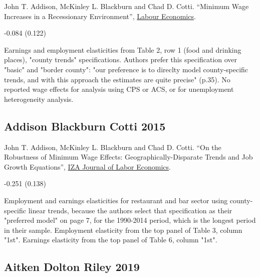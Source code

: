 \noindent John T. Addison, McKinley L. Blackburn and Chad D. Cotti. ``Minimum Wage Increases in a Recessionary Environment'', \href{https://doi.org/10.1016/j.labeco.2013.02.004}{Labour Economics}.

\vspace{0.7em}

 -0.084 (0.122)

\vspace{0.7em}

 Earnings and employment elasticities from Table 2, row 1 (food and drinking places), "county trends" specifications. Authors prefer this specification over "basic" and "border county": "our preference is to direclty model county-specific trends, and with this approach the estimates are quite precise" (p.35). No reported wage effects for analysis using CPS or ACS, or for unemployment heterogeneity analysis.

\subsection*{Addison Blackburn Cotti 2015}
\vspace{-0.7em}

\noindent John T. Addison, McKinley L. Blackburn and Chad D. Cotti. ``On the Robustness of Minimum Wage Effects: Geographically-Disparate Trends and Job Growth Equations'', \href{https://doi.org/10.1186/s40172-015-0039-z}{IZA Journal of Labor Economics}.

\vspace{0.7em}

 -0.251 (0.138)

\vspace{0.7em}

 Employment and earnings elasticities for restaurant and bar sector using county-specific linear trends, because the authors select that specification as their "preferred model" on page 7, for the 1990-2014 period, which is the longest period in their sample. Employment elasticity from the top panel of Table 3, column "1st". Earnings elasticity from the top panel of Table 6, column "1st".

\subsection*{Aitken Dolton Riley 2019}
\vspace{-0.7em}

